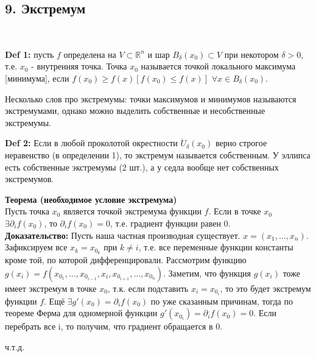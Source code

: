 \documentclass[book, 11pt]{report}
\begin{document}
    \subsection*{9. Экстремум}
    \par{\ }
    \par{\textbf{Def 1:} пусть $f$ определена на $V\subset\mathbb{R}^n$ и шар $B_\delta(x_0)\subset V$ при некотором $\delta > 0$, т.е. $x_0$ - внутренняя точка. Точка $x_0$ называется точкой локального максимума [минимума], если $f(x_0)\geq f(x) [f(x_0)\leq f(x)]$ $\forall x\in B_\delta(x_0)$.}
    \par{Несколько слов про экстремумы: точки максимумов и минимумов называются экстремумами, однако можно выделить собственные и несобственные экстремумы.}
    \par{
    \textbf{Def 2:} Если в любой проколотой окрестности $\mathring{U}_\delta(x_0)$ верно строгое неравенство (в определении 1), то экстремум называется собственным. У эллипса есть собственные экстремумы (2 шт.), а у седла вообще нет собственных экстремумов.
    }
    \vspace{0.5cm}
    \par{\textbf{Теорема (необходимое условие экстремума)}\\
    Пусть точка $x_0$ является точкой экстремума функции $f$. Если в точке $x_0$ $\exists\partial_if(x_0)$, то $\partial_if(x_0)=0$, т.е. градиент функции равен 0. \\ 
    \textbf{Доказательство: } Пусть наша частная производная существует. $x=(x_1,\ldots,x_n).$ Зафиксируем все $x_k=x_{0_k}$ при $k\ne i$, т.е. все переменные функции константы кроме той, по которой дифференцировали. Рассмотрим функцию $g(x_i)=f(x_{0_1}, \ldots,x_{0_{i-1}}, x_i,x_{0_{i+1}},\ldots, x_{0_n})$. Заметим, что функция $g(x_i)$ тоже имеет экстремум в точке $x_0$, т.к. если подставить $x_i=x_{0_i}$, то это будет экстремум функции $f$. Ещё $\exists g'(x_0)=\partial_if(x_0)$ по уже сказанным причинам, тогда по теореме Ферма для одномерной функции $g'(x_{0_i})=\partial_if(x_0)=0$. Если перебрать все i, то получим, что градиент обращается в 0.
    }
    \par{{\raggedleft ч.т.д.\par}}
    \vspace{0.5cm}
\end{document}
